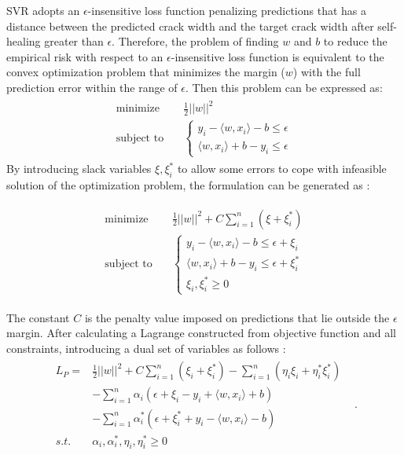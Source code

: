 \documentclass[11pt]{article}
\begin{document}
	SVR adopts an $\epsilon$-insensitive loss function penalizing predictions that has a distance between the predicted crack width and the target crack width after self-healing greater than $\epsilon$.  Therefore, the problem of finding $w$ and $b$ to reduce the empirical risk with respect to an $\epsilon$-insensitive loss function is equivalent to the convex optimization problem that minimizes the margin ($w$) with the full prediction error within the range of $\epsilon$. Then this problem can be expressed as: 
	\begin{eqnarray} \label{svr2}
	\begin{aligned}
	\text{minimize} \quad& \frac{1}{2} ||w||^2 \\
	\text{subject to} \quad & 
	\left  \{ 
	\begin{array}{l}
	y_i -\langle w,x_i \rangle -b \le \epsilon \\
	\langle w,x_i \rangle +b -y_i \le \epsilon
	\end{array}
	\right.
	\end{aligned}                                                            
	\end{eqnarray}
	By introducing slack variables $\xi, \xi_i^*$ to allow some errors to cope with infeasible solution of the optimization problem, the formulation can be generated as \cite{vapnik1999overview}: 
	
	\begin{eqnarray}
	\begin{aligned}
	\text{minimize} \quad &  \frac{1}{2} ||w||^2 + C \sum_{i=1}^{n}(\xi + \xi_i^*) \\
	\text{subject to} \quad& 
	\left \{
	\begin{array}{l}
	y_i - \langle w, x_i \rangle -b \le \epsilon + \xi_i \\
	\langle w, x_i \rangle + b - y_i \le  \epsilon + \xi_i^* \\
	\xi_i, \xi_i^* \ge 0 
	\end{array}
	\right.
	\end{aligned}                                                              
	\end{eqnarray}
	
	The constant $C$  is the penalty value imposed on predictions that lie outside the $\epsilon$ margin. After calculating a Lagrange constructed from objective function and all constraints, introducing a dual set of variables as follows \cite{yuvaraj2013support}:
	\begin{eqnarray}
	\begin{aligned}
	L_P  = & \frac{1}{2} ||w||^2 +C\sum_{i=1}^{n} (\xi_i + \xi_i^*) - \sum_{i=1}^{n} (\eta_i \xi_i + \eta_i^* \xi_i^*) \\
	& -\sum_{i=1}^{n} \alpha_i (\epsilon + \xi_i - y_i + \langle w, x_i \rangle + b) \\
	& - \sum_{i=1}^{n} \alpha_i^* (\epsilon + \xi_i^* +y_i - \langle w, x_i \rangle -b )
	& \\
	s.t. \quad & \alpha_i, \alpha_i^*, \eta_i, \eta_i^* \ge 0 
	\end{aligned}.                                                               
	\end{eqnarray}
	
\end{document}
